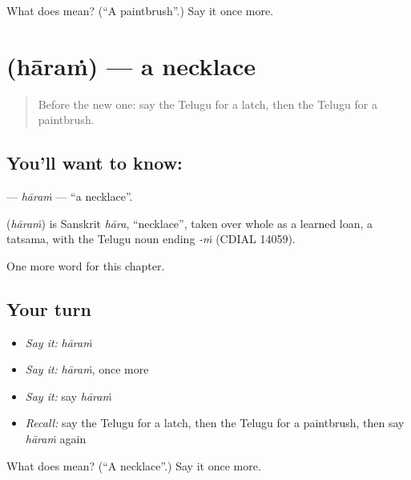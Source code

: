 \begin{tcolorbox}[breakable,colback=teal!4,colframe=teal!35!black,title={Before you move on}]
What does  mean? (\textquotedblleft{}A paintbrush\textquotedblright{}.) Say it once more.
\end{tcolorbox}
\section[\texorpdfstring{\te{హారం} (hāraṁ)}{హారం (hāraṁ)}]{ (hāraṁ) — a necklace}

\label{lesson:TE-C192-haram}



\begin{quote}
Before the new one: say the Telugu for a latch, then the Telugu for a paintbrush.
\end{quote}

\subsection*{You'll want to know: }
\textbf{} — \emph{hāraṁ} — \textquotedblleft{}a necklace\textquotedblright{}.

\begin{cousinweb}
\textbf{} (\emph{hāraṁ}) is Sanskrit \emph{hāra}, \textquotedblleft{}necklace\textquotedblright{}, taken over whole as a learned loan, a tatsama, with the Telugu noun ending \emph{-ṁ} (CDIAL 14059).
\end{cousinweb}

\begin{grammarlens}[title={What you've built}]
One more word for this chapter.
\end{grammarlens}

\subsection*{Your turn}
\begin{itemize}
\raggedright
  \item \emph{Say it:} \emph{hāraṁ}
  \item \emph{Say it:} \emph{hāraṁ}, once more
  \item \emph{Say it:} say \emph{hāraṁ}
  \item \emph{Recall:} say the Telugu for a latch, then the Telugu for a paintbrush, then say \emph{hāraṁ} again
\end{itemize}

\begin{tcolorbox}[breakable,colback=teal!4,colframe=teal!35!black,title={Before you move on}]
What does  mean? (\textquotedblleft{}A necklace\textquotedblright{}.) Say it once more.
\end{tcolorbox}
